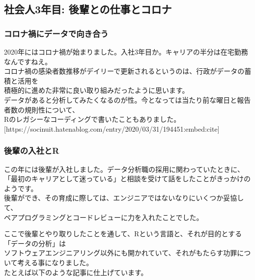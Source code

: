 \documentclass[
  letterpaper,
  DIV=11,
  numbers=noendperiod]{scrartcl}
\begin{document}
\hypertarget{ux793eux4f1aux4eba3ux5e74ux76ee-ux5f8cux8f29ux3068ux306eux4ed5ux4e8bux3068ux30b3ux30edux30ca}{%
\subsection{社会人3年目:
後輩との仕事とコロナ}\label{ux793eux4f1aux4eba3ux5e74ux76ee-ux5f8cux8f29ux3068ux306eux4ed5ux4e8bux3068ux30b3ux30edux30ca}}

\hypertarget{ux30b3ux30edux30caux798dux306bux30c7ux30fcux30bfux3067ux5411ux304dux5408ux3046}{%
\subsubsection{コロナ禍にデータで向き合う}\label{ux30b3ux30edux30caux798dux306bux30c7ux30fcux30bfux3067ux5411ux304dux5408ux3046}}

2020年にはコロナ禍が始まりました。入社3年目か。キャリアの半分は在宅勤務なんですねえ。\\
コロナ禍の感染者数推移がデイリーで更新されるというのは、行政がデータの蓄積と活用を\\
積極的に進めた非常に良い取り組みだったように思います。\\
データがあると分析してみたくなるのが性。今となっては当たり前な曜日と報告者数の規則性について、\\
Rのレガシーなコーディングで書いたこともありました。
{[}https://socinuit.hatenablog.com/entry/2020/03/31/194451:embed:cite{]}

\hypertarget{ux5f8cux8f29ux306eux5165ux793eux3068r}{%
\subsubsection{後輩の入社とR}\label{ux5f8cux8f29ux306eux5165ux793eux3068r}}

この年には後輩が入社しました。データ分析職の採用に関わっていたときに、\\
「最初のキャリアとして迷っている」と相談を受けて話をしたことがきっかけのようです。\\
後輩ができ、その育成に際しては、エンジニアではないなりにいくつか妥協して、\\
ペアプログラミングとコードレビューに力を入れたことでした。

ここで後輩とやり取りしたことを通して、Rという言語と、それが目的とする「データの分析」は\\
ソフトウェアエンジニアリング以外にも開かれていて、それがもたらす功罪について考える事になりました。\\
たとえば以下のような記事に仕上げています。
\end{document}
